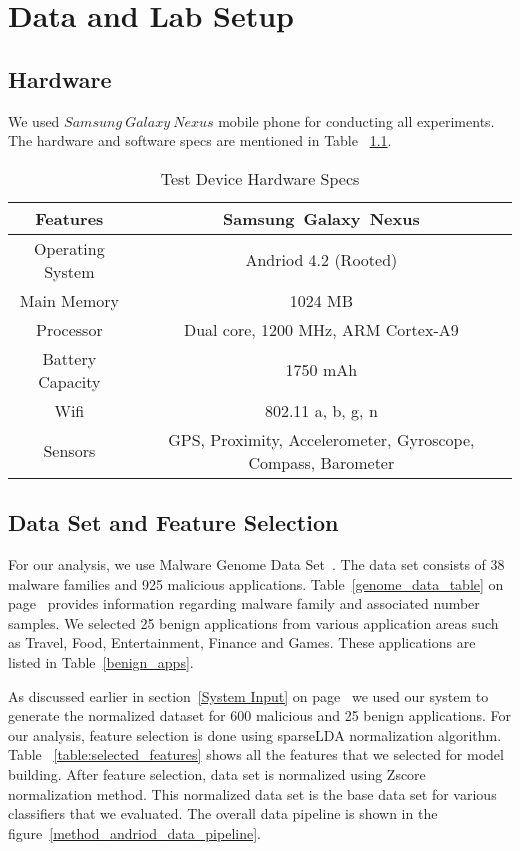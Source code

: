 \chapter{Data and Lab Setup}
\thispagestyle{plain}
\label {Data Lab Setup}
\section{Hardware}
We used $Samsung\ Galaxy\ Nexus$ mobile phone for conducting all experiments. The hardware and software specs are mentioned in Table ~\ref{table:samsung_galexy_nexsus}.
\begin{table}[htbp]
\caption{Test Device Hardware Specs}
\bigskip
\label{table:samsung_galexy_nexsus}
\centering
\begin{center}
\begin{tabular}{|c|c|}
\hline
Features & Samsung\ Galaxy\ Nexus \\ \hline
Operating System & Andriod 4.2 (Rooted) \\ \hline
Main Memory & 1024 MB \\ \hline
Processor & Dual core, 1200 MHz, ARM Cortex-A9 \\ \hline
Battery Capacity  & 1750 mAh \\ \hline
Wifi & 802.11 a, b, g, n \\ \hline
Sensors & GPS, Proximity, Accelerometer, Gyroscope, Compass, Barometer \\ \hline
\end{tabular}
\end{center}
\end{table}
\section{Data Set and Feature Selection}
For our analysis, we use Malware Genome Data Set~\cite{54}. The data set consists of 38 malware families and 925 malicious applications. Table~\ref{genome_data_table} on page~\pageref{genome_data_table} provides information regarding malware family and associated number samples. We selected 25 benign applications from various application areas such as Travel, Food, Entertainment, Finance and Games. These applications are listed in Table~\ref{benign_apps}. 

As discussed earlier in section~\ref{System Input} on page~\pageref{System Input} we used our system to generate the normalized dataset for 600 malicious and 25 benign applications. For our analysis, feature selection is done using sparseLDA normalization algorithm. Table ~\ref{table:selected_features} shows all the features that we selected for model building. After feature selection, data set is normalized using Zscore normalization method. This normalized data set is the base data set for various classifiers that we evaluated. The overall data pipeline is shown in the figure~\ref{method_andriod_data_pipeline}.

